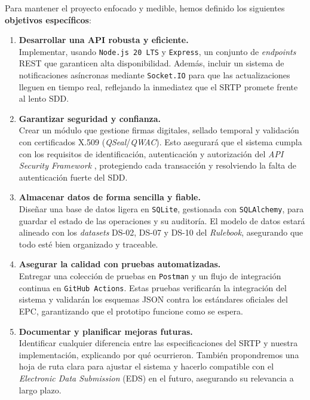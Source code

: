Para mantener el proyecto enfocado y medible, hemos definido los siguientes \textbf{objetivos específicos}:

\begin{enumerate}[leftmargin=0.75cm]
  \item \textbf{Desarrollar una API robusta y eficiente.} \\
        Implementar, usando \texttt{Node.js 20 LTS} y \texttt{Express}, un conjunto de \textit{endpoints} REST que garanticen alta disponibilidad. Además, incluir un sistema de notificaciones asíncronas mediante \texttt{Socket.IO} para que las actualizaciones lleguen en tiempo real, reflejando la inmediatez que el SRTP promete frente al lento SDD.

  \item \textbf{Garantizar seguridad y confianza.} \\
        Crear un módulo que gestione firmas digitales, sellado temporal y validación con certificados X.509 (\textit{QSeal}/\textit{QWAC}). Esto asegurará que el sistema cumpla con los requisitos de identificación, autenticación y autorización del \textit{API Security Framework} \cite{epc164}, protegiendo cada transacción y resolviendo la falta de autenticación fuerte del SDD.

  \item \textbf{Almacenar datos de forma sencilla y fiable.} \\
        Diseñar una base de datos ligera en \texttt{SQLite}, gestionada con \texttt{SQLAlchemy}, para guardar el estado de las operaciones y su auditoría. El modelo de datos estará alineado con los \textit{datasets} DS-02, DS-07 y DS-10 del \textit{Rulebook}, asegurando que todo esté bien organizado y traceable.

  \item \textbf{Asegurar la calidad con pruebas automatizadas.} \\
        Entregar una colección de pruebas en \texttt{Postman} y un flujo de integración continua en \texttt{GitHub Actions}. Estas pruebas verificarán la integración del sistema y validarán los esquemas JSON contra los estándares oficiales del EPC, garantizando que el prototipo funcione como se espera.

  \item \textbf{Documentar y planificar mejoras futuras.} \\
        Identificar cualquier diferencia entre las especificaciones del SRTP y nuestra implementación, explicando por qué ocurrieron. También propondremos una hoja de ruta clara para ajustar el sistema y hacerlo compatible con el \textit{Electronic Data Submission} (EDS) en el futuro, asegurando su relevancia a largo plazo.

\end{enumerate}


